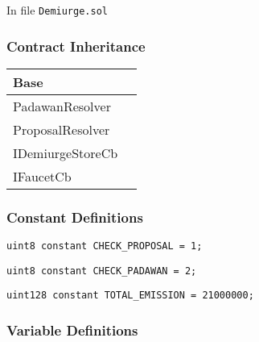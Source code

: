 \minitoc

In file {\tt Demiurge.sol}

\subsubsection{Contract Inheritance}


\noindent\begin{tabular}{|l|p{5cm}|}\hline
Base & \\\hline
PadawanResolver & \\\hline
ProposalResolver & \\\hline
IDemiurgeStoreCb & \\\hline
IFaucetCb & \\\hline
\end{tabular}


\subsubsection{Constant Definitions}


\begin{lstlisting}[firstnumber=30]
    uint8 constant CHECK_PROPOSAL = 1;
\end{lstlisting}

\begin{lstlisting}[firstnumber=31]
    uint8 constant CHECK_PADAWAN = 2;
\end{lstlisting}

\begin{lstlisting}[firstnumber=33]
    uint128 constant TOTAL_EMISSION = 21000000;
\end{lstlisting}

\subsubsection{Variable Definitions}


